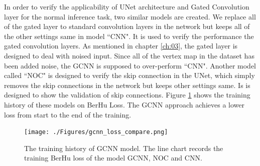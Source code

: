 \documentclass[border=15pt, multi, tikz]{article}
\begin{document}
In order to verify the applicability of UNet architecture and Gated Convolution layer for the normal inference task, two similar models are created. 
We replace all of the gated layer to standard convolution layers in the network but keeps all of the other settings same in model ``CNN". It is used to verify the performance the gated convolution layers. As mentioned in chapter \ref{ch:03}, the gated layer is designed to deal with noised input. Since all of the vertex map in the dataset has been added noise, the GCNN is supposed to over-perform ``CNN". Another model called ``NOC" is designed to verify the skip connection in the UNet, which simply removes the skip connections in the network but keeps other settings same. Is is designed to show the validation of skip connections. Figure \ref{fig:gcnn-training-history} shows the training history of these models on BerHu Loss. The GCNN approach achieves a lower loss from start to the end of the training.

\begin{figure}[th]
	\centering
	\texttt{[image: ./Figures/gcnn\_loss\_compare.png]}
	\caption{The training history of GCNN model. The line chart records the training BerHu loss of the model GCNN, NOC and CNN.}
	\label{fig:gcnn-training-history}
\end{figure}
\end{document}
